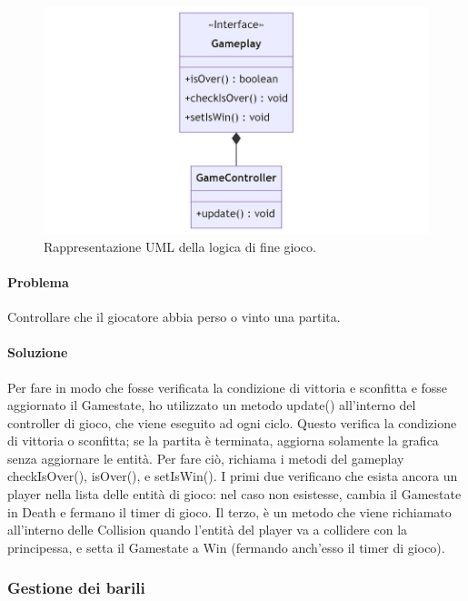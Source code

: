 \documentclass[a4paper,12pt]{report}
\begin{document}
\begin{figure}[H]
\centering{}
\includegraphics[width=\textwidth]{img/gameplay.jpg}
\caption{Rappresentazione UML della logica di fine gioco.}
\end{figure}

\paragraph{Problema} Controllare che il giocatore abbia perso o vinto una partita.

\paragraph{Soluzione} Per fare in modo che fosse verificata la condizione di vittoria e sconfitta e fosse aggiornato il Gamestate, ho utilizzato un metodo update() all’interno del controller di gioco, che viene eseguito ad ogni ciclo. Questo verifica la condizione di vittoria o sconfitta; se la partita è terminata, aggiorna solamente la grafica senza aggiornare le entità. Per fare ciò, richiama i metodi del gameplay checkIsOver(), isOver(), e setIsWin(). I primi due verificano che esista ancora un player nella lista delle entità di gioco: nel caso non esistesse, cambia il Gamestate in Death e fermano il timer di gioco. Il terzo, è un metodo che viene richiamato all’interno delle Collision quando l’entità del player va a collidere con la principessa, e setta il Gamestate a Win (fermando anch’esso il timer di gioco).

\subsubsection{Gestione dei barili}
\end{document}
